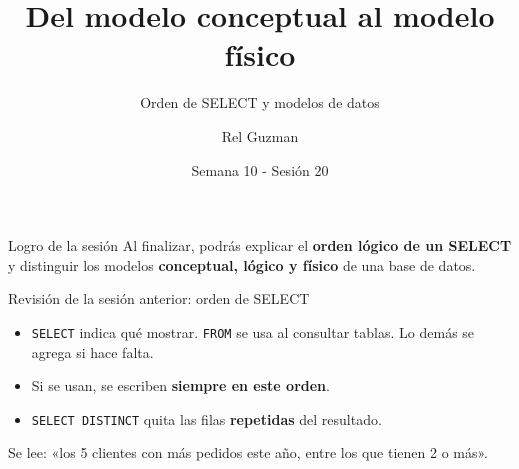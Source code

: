 \documentclass[aspectratio=169,10pt,c]{beamer}
\title{Del modelo conceptual al modelo físico}
\subtitle{Orden de SELECT y modelos de datos}
\date{Semana 10 - Sesión 20}
\author{Rel Guzman}
\newcommand{\kw}[1]{\textcolor{utpRojo}{\textbf{#1}}}
\newcommand{\piezax}{7.6}
\newcommand{\pieza}[3]{%
  \node[pieza] at (0,#1) {#2};
  \node[para] at (\piezax,#1) {\textcolor{utpRojo}{$\blacktriangleleft$}\ #3};}
\begin{document}
{\maketitle}
\begin{frame}[c]
\begin{block}{Logro de la sesión}
Al finalizar, podrás explicar el \textbf{orden lógico de un SELECT} y distinguir los modelos \textbf{conceptual, lógico y físico} de una base de datos.
\end{block}
\end{frame}
\begin{frame}{Revisión de la sesión anterior: orden de SELECT}
\begin{center}
\end{center}
\vspace{-0.05cm}
\begin{itemize}\setlength\itemsep{3pt}
  \item \texttt{SELECT} indica qué mostrar. \texttt{FROM} se usa al consultar tablas. Lo demás se agrega si hace falta.
  \item Si se usan, se escriben \textbf{siempre en este orden}.
  \item \texttt{SELECT DISTINCT} quita las filas \textbf{repetidas} del resultado.
\end{itemize}
\vspace{0.05cm}
\small\color{utpGris} Se lee: «los 5 clientes con más pedidos este año, entre los que tienen 2 o más».
\end{frame}
\end{document}
